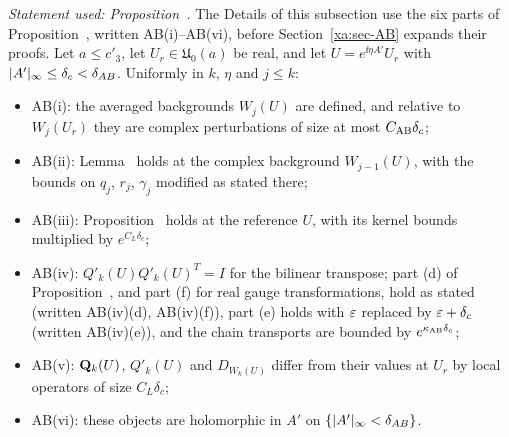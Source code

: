 \emph{Statement used: Proposition~.} The Details of this subsection use the six parts of Proposition~, written AB(i)--AB(vi), before Section~\ref{xa:sec-AB} expands their proofs. Let $a\le c'_3$, let $U_r\in\mathfrak U_0(a)$ be real, and let $U=e^{\ii\eta A'}U_r$ with $\lvert A'\rvert_\infty\le\delta_c<\delta_{AB}$. Uniformly in $k$, $\eta$ and $j\le k$:
\begin{itemize}
\item AB(i): the averaged backgrounds $W_j(U)$ are defined, and relative to $W_j(U_r)$ they are complex perturbations of size at most $C_{\rm AB}\delta_c$;
\item AB(ii): Lemma~ holds at the complex background $W_{j-1}(U)$, with the bounds on $q_j$, $r_j$, $\gamma_j$ modified as stated there;
\item AB(iii): Proposition~ holds at the reference $U$, with its kernel bounds multiplied by $e^{C_L\delta_c}$;
\item AB(iv): $Q'_k(U)Q'_k(U)^T=I$ for the bilinear transpose; part (d) of Proposition~, and part (f) for real gauge transformations, hold as stated (written AB(iv)(d), AB(iv)(f)), part (e) holds with $\varepsilon$ replaced by $\varepsilon+\delta_c$ (written AB(iv)(e)), and the chain transports are bounded by $e^{\kappa_{\rm AB}\delta_c}$;
\item AB(v): $\mathbf Q_k(U)$, $Q'_k(U)$ and $D_{W_k(U)}$ differ from their values at $U_r$ by local operators of size $C_L\delta_c$;
\item AB(vi): these objects are holomorphic in $A'$ on $\{\lvert A'\rvert_\infty<\delta_{AB}\}$.
\end{itemize}

